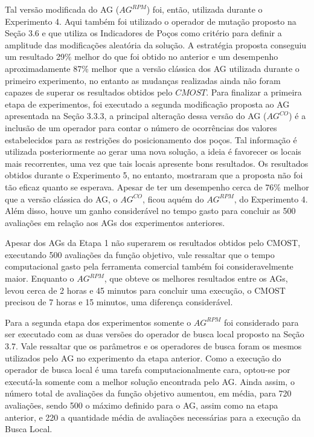 Tal versão modificada do AG ($AG^{RPM}$) foi, então, utilizada durante o Experimento 4. Aqui também foi utilizado o operador de mutação proposto na Seção  3.6 e que utiliza os Indicadores de Poços como critério para definir a amplitude das modificações aleatória da solução. A estratégia proposta conseguiu um resultado 29\% melhor do que foi obtido no anterior e um desempenho aproximadamente 87\% melhor que a versão clássica dos AG utilizada durante o primeiro experimento, no entanto as mudanças realizadas ainda não foram capazes de superar os resultados obtidos pelo $CMOST$. Para finalizar a primeira etapa de experimentos, foi executado a segunda modificação proposta ao AG apresentada na Seção  3.3.3, a principal alteração dessa versão do AG ($AG^{CO}$) é a inclusão de um operador para contar o número de ocorrências dos valores estabelecidos para as restrições do posicionamento dos poços. Tal informação é utilizada posteriormente ao gerar uma nova solução, a ideia é favorecer os locais mais recorrentes, uma vez que tais locais apresente bons resultados. Os resultados obtidos durante o Experimento 5, no entanto, mostraram que a proposta não foi tão eficaz quanto se esperava. Apesar de ter um desempenho cerca de 76\% melhor que a versão clássica do AG, o $AG^{CO}$, ficou aquém do $AG^{RPM}$, do Experimento 4. Além disso, houve um ganho considerável no tempo gasto para concluir as 500 avaliações em relação aos AGs dos experimentos anteriores.

Apesar dos AGs da Etapa 1 não superarem os resultados obtidos pelo CMOST, executando 500 avaliações da função objetivo, vale ressaltar que o tempo computacional gasto pela ferramenta comercial também foi consideravelmente maior. Enquanto o $AG^{RPM}$, que obteve os melhores resultados entre os AGs, levou cerca de 2 horas e 45 minutos para concluir uma execução, o CMOST precisou de 7 horas e 15 minutos, uma diferença considerável.

Para a segunda etapa dos experimentos somente o $AG^{RPM}$ foi considerado para ser executado com as duas versões do operador de busca local proposto na Seção  3.7. Vale ressaltar que os parâmetros e os operadores de busca foram os mesmos utilizados pelo AG no experimento da etapa anterior. Como a execução do operador de busca local é uma tarefa computacionalmente cara, optou-se por executá-la somente com a melhor solução encontrada pelo AG. Ainda assim, o número total de avaliações da função objetivo aumentou, em média, para 720 avaliações, sendo 500 o máximo definido para o AG, assim como na etapa anterior, e 220 a quantidade média de avaliações necessárias para a execução da Busca Local.

